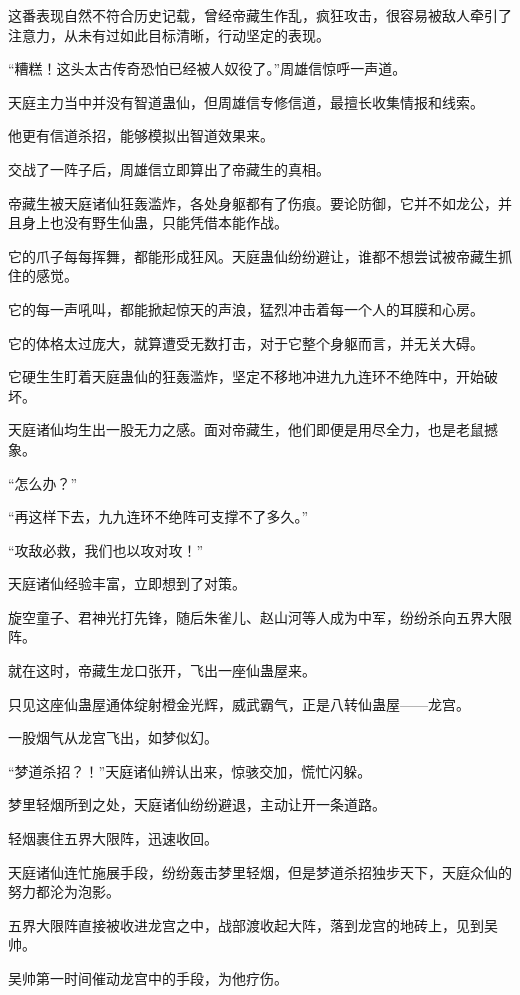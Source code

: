 \begin{this_body}
这番表现自然不符合历史记载，曾经帝藏生作乱，疯狂攻击，很容易被敌人牵引了注意力，从未有过如此目标清晰，行动坚定的表现。

“糟糕！这头太古传奇恐怕已经被人奴役了。”周雄信惊呼一声道。

天庭主力当中并没有智道蛊仙，但周雄信专修信道，最擅长收集情报和线索。

他更有信道杀招，能够模拟出智道效果来。

交战了一阵子后，周雄信立即算出了帝藏生的真相。

帝藏生被天庭诸仙狂轰滥炸，各处身躯都有了伤痕。要论防御，它并不如龙公，并且身上也没有野生仙蛊，只能凭借本能作战。

它的爪子每每挥舞，都能形成狂风。天庭蛊仙纷纷避让，谁都不想尝试被帝藏生抓住的感觉。

它的每一声吼叫，都能掀起惊天的声浪，猛烈冲击着每一个人的耳膜和心房。

它的体格太过庞大，就算遭受无数打击，对于它整个身躯而言，并无关大碍。

它硬生生盯着天庭蛊仙的狂轰滥炸，坚定不移地冲进九九连环不绝阵中，开始破坏。

天庭诸仙均生出一股无力之感。面对帝藏生，他们即便是用尽全力，也是老鼠撼象。

“怎么办？”

“再这样下去，九九连环不绝阵可支撑不了多久。”

“攻敌必救，我们也以攻对攻！”

天庭诸仙经验丰富，立即想到了对策。

旋空童子、君神光打先锋，随后朱雀儿、赵山河等人成为中军，纷纷杀向五界大限阵。

就在这时，帝藏生龙口张开，飞出一座仙蛊屋来。

只见这座仙蛊屋通体绽射橙金光辉，威武霸气，正是八转仙蛊屋——龙宫。

一股烟气从龙宫飞出，如梦似幻。

“梦道杀招？！”天庭诸仙辨认出来，惊骇交加，慌忙闪躲。

梦里轻烟所到之处，天庭诸仙纷纷避退，主动让开一条道路。

轻烟裹住五界大限阵，迅速收回。

天庭诸仙连忙施展手段，纷纷轰击梦里轻烟，但是梦道杀招独步天下，天庭众仙的努力都沦为泡影。

五界大限阵直接被收进龙宫之中，战部渡收起大阵，落到龙宫的地砖上，见到吴帅。

吴帅第一时间催动龙宫中的手段，为他疗伤。


\end{this_body}
